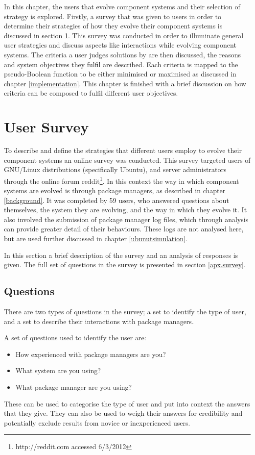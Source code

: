 In this chapter, the users that evolve component systems and their selection of strategy is explored. 
Firstly, a survey that was given to users in order to determine their strategies of how they evolve their component systems is discussed in section \ref{strat.usersurvey}.
This survey was conducted in order to illuminate general user strategies and discuss aspects like interactions while evolving component systems.
The criteria a user judges solutions by are then discussed, the reasons and system objectives they fulfil are described.
Each criteria is mapped to the pseudo-Boolean function to be either minimised or maximised as discussed in chapter \ref{implementation}.
This chapter is finished with a brief discussion on how criteria can be composed to fulfil different user objectives. 

\section{User Survey}
\label{strat.usersurvey}
To describe and define the strategies that different users employ to evolve their component systems an online survey was conducted.
This survey targeted users of GNU/Linux distributions (specifically Ubuntu), and server administrators through the online forum reddit\footnote{http://reddit.com accessed 6/3/2012}.
In this context the way in which component systems are evolved is through package managers, as described in chapter \ref{background}.
It was completed by 59 users, who answered questions about themselves, the system they are evolving, and the way in which they evolve it.
It also involved the submission of package manager log files, which through analysis can provide greater detail of their behaviours.
These logs are not analysed here, but are used further discussed in chapter \ref{ubunutsimulation}.

In this section a brief description of the survey and an analysis of responses is given.
The full set of questions in the survey is presented in section \ref{apx.survey}. 

\subsection{Questions}
There are two types of questions in the survey; a set to identify the type of user, and a set to describe their interactions with package managers.

A set of questions used to identify the user are:
\begin{itemize}
  \item How experienced with package managers are you? 
  \item What system are you using?
  \item What package manager are you using?
\end{itemize}
These can be used to categorise the type of user and put into context the answers that they give.
They can also be used to weigh their answers for credibility and potentially exclude results from novice or inexperienced users. 

